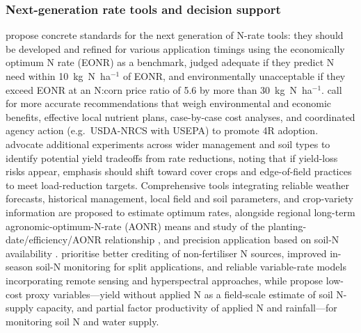 \subsubsection{Next-generation rate tools and decision support}

\textcite{Bandura2025} propose concrete standards for the next generation of N-rate tools: they should be developed and refined for various application timings using the economically optimum N rate (EONR) as a benchmark, judged adequate if they predict N need within 10~kg~N~ha$^{-1}$ of EONR, and environmentally unacceptable if they exceed EONR at an N:corn price ratio of 5.6 by more than 30~kg~N~ha$^{-1}$. \textcite{Liu2021} call for more accurate recommendations that weigh environmental and economic benefits, effective local nutrient plans, case-by-case cost analyses, and coordinated agency action (e.g.\ USDA-NRCS with USEPA) to promote 4R adoption. \textcite{Banger2018} advocate additional experiments across wider management and soil types to identify potential yield tradeoffs from rate reductions, noting that if yield-loss risks appear, emphasis should shift toward cover crops and edge-of-field practices to meet load-reduction targets. Comprehensive tools integrating reliable weather forecasts, historical management, local field and soil parameters, and crop-variety information are proposed to estimate optimum rates, alongside regional long-term agronomic-optimum-N-rate (AONR) means and study of the planting-date/efficiency/AONR relationship \parencite{Maas2022}, and precision application based on soil-N availability \parencite{Gupta2023}. \textcite{Dinnes2002} prioritise better crediting of non-fertiliser N sources, improved in-season soil-N monitoring for split applications, and reliable variable-rate models incorporating remote sensing and hyperspectral approaches, while \textcite{Cassman2025} propose low-cost proxy variables---yield without applied N as a field-scale estimate of soil N-supply capacity, and partial factor productivity of applied N and rainfall---for monitoring soil N and water supply.

